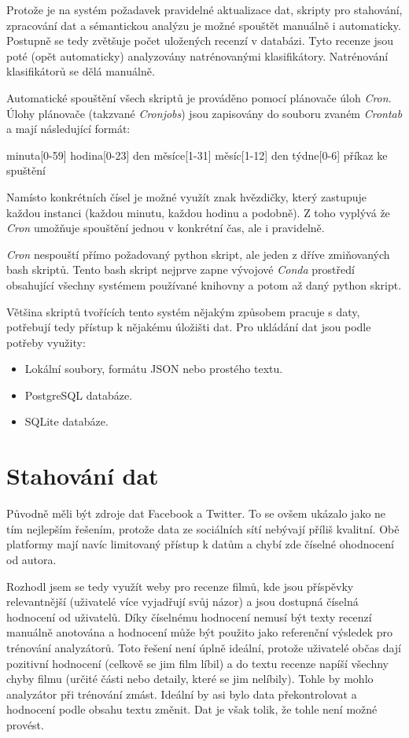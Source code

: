 Protože je na systém požadavek pravidelné aktualizace dat, skripty pro stahování, zpracování dat a sémantickou analýzu je možné spouštět manuálně i automaticky. Postupně se tedy zvětšuje počet uložených recenzí v databázi. Tyto recenze jsou poté (opět automaticky) analyzovány natrénovanými klasifikátory. Natrénování klasifikátorů se dělá manuálně.

Automatické spouštění všech skriptů je prováděno pomocí plánovače úloh \emph{Cron}. Úlohy plánovače (takzvané \emph{Cronjobs}) jsou zapisovány do souboru zvaném \emph{Crontab} a mají následující formát:
\begin{center}
minuta[0-59] hodina[0-23] den měsíce[1-31] měsíc[1-12] den týdne[0-6] příkaz ke spuštění
\end{center}

Namísto konkrétních čísel je možné využít znak hvězdičky, který zastupuje každou instanci (každou minutu, každou hodinu a podobně).
Z toho vyplývá že \emph{Cron} umožňuje spouštění jednou v konkrétní čas, ale i pravidelně.

\emph{Cron} nespouští přímo požadovaný python skript, ale jeden z dříve zmiňovaných bash skriptů. Tento bash skript nejprve zapne vývojové \emph{Conda} prostředí obsahující všechny systémem používané knihovny a potom až daný python skript.

Většina skriptů tvořících tento systém nějakým způsobem pracuje s daty, potřebují tedy přístup k nějakému úložišti dat. 
\clearpage
\pagebreak
Pro ukládání dat jsou podle potřeby využity:
\begin{itemize}
    \item Lokální soubory, formátu JSON nebo prostého textu.
    \item PostgreSQL databáze.
    \item SQLite databáze.
\end{itemize}

 

\section{Stahování dat}
Původně měli být zdroje dat Facebook a Twitter.
To se ovšem ukázalo jako ne tím nejlepším řešením, protože data ze sociálních sítí nebývají příliš kvalitní. Obě platformy mají navíc limitovaný přístup k datům a chybí zde číselné ohodnocení od autora.

Rozhodl jsem se tedy využít weby pro recenze filmů, kde jsou příspěvky relevantnější (uživatelé více vyjadřují svůj názor) a jsou dostupná číselná hodnocení od uživatelů. Díky číselnému hodnocení nemusí být texty recenzí manuálně anotována a hodnocení může být použito jako referenční výsledek pro trénování analyzátorů.
Toto řešení není úplně ideální, protože uživatelé občas dají pozitivní hodnocení (celkově se jim film líbil) a do textu recenze napíší všechny chyby filmu (určité části nebo detaily, které se jim nelíbily). Tohle by mohlo analyzátor při trénování zmást. Ideální by asi bylo data překontrolovat a hodnocení podle obsahu textu změnit. Dat je však tolik, že tohle není možné provést.


